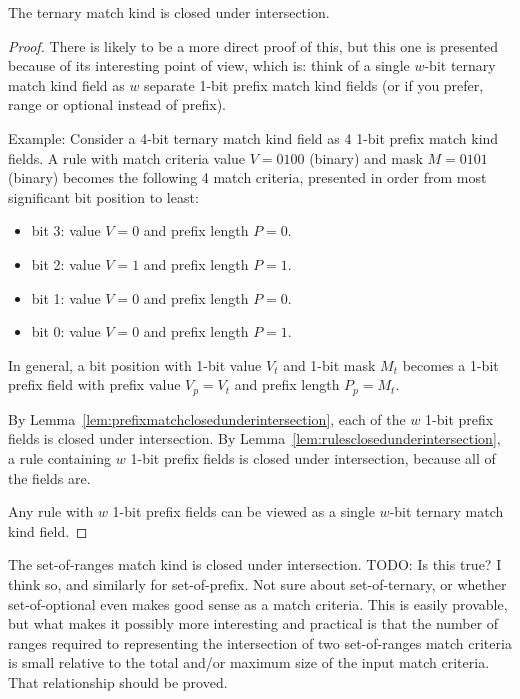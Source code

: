 \documentclass[acmsmall]{acmart}
\newcommand{\todo}[1]{}
\renewcommand{\todo}[1]{{\color{red} TODO: {#1}}}
\begin{document}
\begin{lemma}
\label{lem:ternarymatchclosedunderintersection}
The ternary match kind is closed under intersection.
\end{lemma}

\begin{proof}
There is likely to be a more direct proof of this,
but this one is presented because of its interesting point of view,
which is:
think of a single $w$-bit ternary match kind field
as $w$ separate 1-bit prefix match kind fields
(or if you prefer, range or optional instead of prefix).

Example:
Consider a 4-bit ternary match kind field
as 4 1-bit prefix match kind fields.
A rule with match criteria value $V=0100$ (binary)
and mask $M=0101$ (binary)
becomes the following 4 match criteria,
presented in order from most significant bit position to least:
\begin{itemize}
\item bit 3: value $V=0$ and prefix length $P=0$.
\item bit 2: value $V=1$ and prefix length $P=1$.
\item bit 1: value $V=0$ and prefix length $P=0$.
\item bit 0: value $V=0$ and prefix length $P=1$.
\end{itemize}
In general, a bit position with 1-bit value $V_t$
and 1-bit mask $M_t$
becomes a 1-bit prefix field
with prefix value $V_p=V_t$
and prefix length $P_p=M_t$.

By Lemma~\ref{lem:prefixmatchclosedunderintersection},
each of the $w$ 1-bit prefix fields is closed under intersection.
By Lemma~\ref{lem:rulesclosedunderintersection},
a rule containing $w$ 1-bit prefix fields is closed
under intersection, because all of the fields are.

Any rule with $w$ 1-bit prefix fields can be
viewed as a single $w$-bit ternary match kind field.
\end{proof}

\begin{lemma}
\label{lem:rangemsetatchclosedunderintersection}
The set-of-ranges match kind is closed under intersection.
\todo{Is this true?  I think so, and similarly for
set-of-prefix.  Not sure about set-of-ternary, or whether
set-of-optional even makes good sense as a match criteria.
This is easily provable, but what makes it possibly
more interesting and practical is that the number of ranges
required to representing the intersection of two set-of-ranges
match criteria is small relative to the total and/or maximum
size of the input match criteria.  That relationship should be proved.}
\end{lemma}
\end{document}
